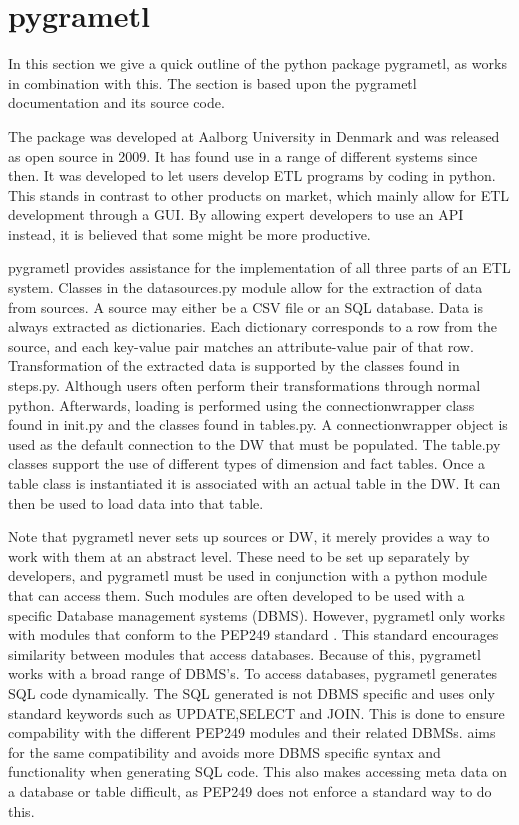 \section{pygrametl}\label{sect:pygrametl}
In this section we give a quick outline of the python package pygrametl, as \FW{} works in combination with this. The section is based upon the pygrametl documentation and its source code\cite{pygramSource}.

The package was developed at Aalborg University in Denmark and was released as open source in 2009. It has found use in a range of different systems since then. It was developed to let users develop ETL programs by coding in python. This stands in contrast to other products on market, which mainly allow for ETL development through a GUI. By allowing expert developers to use an API instead, it is believed that some might be more productive.

pygrametl provides assistance for the implementation of all three parts of an ETL system. Classes in the datasources.py module allow for the extraction of data from sources. A source may either be a CSV file or an SQL database. Data is always extracted as dictionaries. Each dictionary corresponds to a row from the source, and each key-value pair matches an attribute-value pair of that row. Transformation of the extracted data is supported by the classes found in steps.py. Although users often perform their transformations through normal python. Afterwards, loading is performed using the connectionwrapper class found in init.py and the classes found in tables.py. A connectionwrapper object is used as the default connection to the DW that must be populated. The table.py classes support the use of different types of dimension and fact tables. Once a table class is instantiated it is associated with an actual table in the DW. It can then be used to load data into that table.

Note that pygrametl never sets up sources or DW, it merely provides a way to work with them at an abstract level. These need to be set up separately by developers, and pygrametl must be used in conjunction with a python module that can access them. Such modules are often developed to be used with a specific Database management systems (DBMS). However, pygrametl only works with modules that conform to the PEP249 standard \cite{pep249}. This standard encourages similarity between modules that access databases. Because of this, pygrametl works with a broad range of DBMS's. To access databases, pygrametl generates SQL code dynamically. The SQL generated is not DBMS specific and uses only standard keywords such as UPDATE,SELECT and JOIN. This is done to ensure compability with the different PEP249 modules and their related DBMSs. \FW{} aims for the same compatibility and avoids more DBMS specific syntax and functionality when generating SQL code. This also makes accessing meta data on a database or table difficult, as PEP249 does not enforce a standard way to do this.